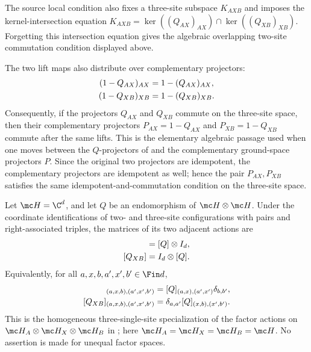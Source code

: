 \begin{definition}
    The source local condition also fixes a three-site subspace $K_{AXB}$ and
    imposes the kernel-intersection equation
    $K_{AXB}=\ker((Q_{AX})_{AX})\cap\ker((Q_{XB})_{XB})$.
    Forgetting this intersection equation gives the algebraic overlapping
    two-site commutation condition displayed above.

    The two lift maps also distribute over complementary projectors:
    \begin{align}
        (1-Q_{AX})_{AX} & =1-(Q_{AX})_{AX},
        \notag                              \\
        (1-Q_{XB})_{XB} & =1-(Q_{XB})_{XB}.
        \notag
    \end{align}
    Consequently, if the projectors $Q_{AX}$ and $Q_{XB}$ commute on the
    three-site space, then their complementary projectors
    $P_{AX}=1-Q_{AX}$ and $P_{XB}=1-Q_{XB}$ commute after the same lifts.
    This is the elementary algebraic passage used when one moves between the
    $Q$-projectors of
    \cite[Appendix~D.2]{Cirac2016MPDO_arXiv} and the complementary ground-space
    projectors $P$. Since the original two projectors are idempotent, the
    complementary projectors are idempotent as well; hence the pair
    $P_{AX},P_{XB}$ satisfies the same idempotent-and-commutation condition on
    the three-site space.
\end{definition}

\begin{lemma}
    \label{thm:pair_lift_kronecker_matrices}
    \leanok
    Let $\mc H=\C^d$, and let $Q$ be an endomorphism of
    $\mc H\otimes\mc H$. Under the coordinate identifications of two- and
    three-site configurations with pairs and right-associated triples, the
    matrices of its two adjacent actions are
    \begin{align}
        [Q_{AX}] & =[Q]\otimes I_d,
        \notag                      \\
        [Q_{XB}] & =I_d\otimes[Q].
        \notag
    \end{align}
    Equivalently, for all $a,x,b,a',x',b'\in\Fin d$,
    \begin{align}
        [Q_{AX}]_{(a,x,b),(a',x',b')}
         & =[Q]_{(a,x),(a',x')}\delta_{b,b'},
        \notag                                \\
        [Q_{XB}]_{(a,x,b),(a',x',b')}
         & =\delta_{a,a'}[Q]_{(x,b),(x',b')}.
        \notag
    \end{align}
    This is the homogeneous three-single-site specialization of the factor
    actions on $\mc H_A\otimes\mc H_X\otimes\mc H_B$ in
    \cite[Definition~D.2]{Cirac2016MPDO_arXiv}; here
    $\mc H_A=\mc H_X=\mc H_B=\mc H$. No assertion is made for unequal factor
    spaces.
\end{lemma}

